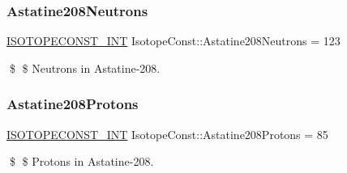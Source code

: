 \subsubsection{\texorpdfstring{Astatine208\+Neutrons}{Astatine208Neutrons}}
{\footnotesize\ttfamily \mbox{\hyperlink{group___isotope_const-_macros_ga5f18360b3e99483a35c32d789e62621c}{I\+S\+O\+T\+O\+P\+E\+C\+O\+N\+S\+T\+\_\+\+I\+NT}} Isotope\+Const\+::\+Astatine208\+Neutrons = 123}

\$ \$ Neutrons in Astatine-\/208. \mbox{\label{group___isotope_const-_astatine-_at208_ga5696dd1616761d59203254fa1abe5b9d}} 
\subsubsection{\texorpdfstring{Astatine208\+Protons}{Astatine208Protons}}
{\footnotesize\ttfamily \mbox{\hyperlink{group___isotope_const-_macros_ga5f18360b3e99483a35c32d789e62621c}{I\+S\+O\+T\+O\+P\+E\+C\+O\+N\+S\+T\+\_\+\+I\+NT}} Isotope\+Const\+::\+Astatine208\+Protons = 85}

\$ \$ Protons in Astatine-\/208. 